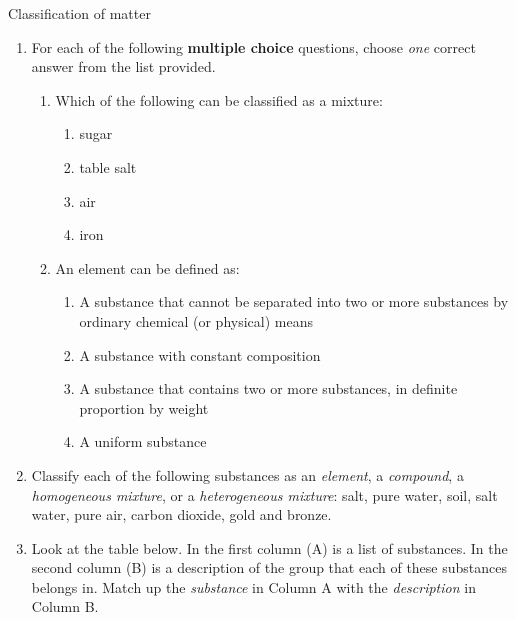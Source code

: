             \begin{eocexercises}{Classification of matter }{
            \nopagebreak
      \label{m38706*id67920}\begin{enumerate}[noitemsep, label=\textbf{\arabic*}. ] 
            \label{m38706*uid133}\item For each of the following \textbf{multiple choice} questions, choose \textsl{one} correct answer from the list provided.
\label{m38706*id67947}\begin{enumerate}[noitemsep, label=\textbf{\alph*}. ] 
            \label{m38706*uid134}\item Which of the following can be classified as a mixture:
\label{m38706*id67963}\begin{enumerate}[noitemsep, label=\textbf{\roman*}. ] 
            \label{m38706*uid135}\item sugar
\label{m38706*uid136}\item table salt
\label{m38706*uid137}\item air
\label{m38706*uid138}\item iron
\end{enumerate}
                \label{m38706*uid139}\item An element can be defined as:
\label{m38706*id68029}\begin{enumerate}[noitemsep, label=\textbf{\roman*}.] 
            \label{m38706*uid140}\item A substance that cannot be separated into two or more substances by ordinary chemical (or physical) means
\label{m38706*uid141}\item A substance with constant composition
\label{m38706*uid142}\item A substance that contains two or more substances, in definite proportion by weight
\label{m38706*uid143}\item A uniform substance
\end{enumerate}
                \end{enumerate}
\label{m38706*uid144}\item Classify each of the following substances as an \textsl{element}, a \textsl{compound}, a \textsl{homogeneous mixture}, or a \textsl{heterogeneous mixture}: salt, pure water, soil, salt water, pure air, carbon dioxide, gold and bronze.\newline
\label{m38706*uid145}\item Look at the table below. In the first column (A) is a list of substances. In the second column (B) is a description of the group that each of these substances belongs in. Match up the \textsl{substance} in Column A with the \textsl{description} in Column B.

\end{enumerate}}
\end{eocexercises}

